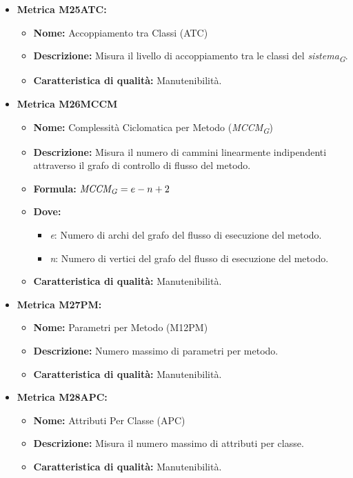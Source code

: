 \begin{itemize}
            \item \textbf{Metrica M25ATC:}
                  \begin{itemize}
                      \item \textbf{Nome:} Accoppiamento tra Classi (ATC)
                      \item \textbf{Descrizione:} Misura il livello di accoppiamento tra le classi del \textit{sistema}\textsubscript{\textit{G}}.
                      \item \textbf{Caratteristica di qualità:} Manutenibilità.
                  \end{itemize}

        \item \textbf{Metrica M26MCCM}
            \begin{itemize}
            \item \textbf{Nome:} Complessità Ciclomatica per Metodo (\textit{MCCM}\textsubscript{\textit{G}})
            \item \textbf{Descrizione:} Misura il numero di cammini linearmente indipendenti attraverso il grafo di controllo di flusso del metodo.
            \item \textbf{Formula:} $\textit{MCCM}\textsubscript{\textit{G}} = e - n + 2$
            \item \textbf{Dove:}
            \begin{itemize}
                        \item \textit{e}: Numero di archi del grafo del flusso di esecuzione del metodo.
                        \item \textit{n}: Numero di vertici del grafo del flusso di esecuzione del metodo.
            \end{itemize}
            \item \textbf{Caratteristica di qualità:} Manutenibilità.
        \end{itemize}

        \item \textbf{Metrica M27PM:}
        \begin{itemize}
            \item \textbf{Nome:} Parametri per Metodo (M12PM)
            \item \textbf{Descrizione:} Numero massimo di parametri per metodo.
            \item \textbf{Caratteristica di qualità:} Manutenibilità.
          \end{itemize}

        \item \textbf{Metrica M28APC:}
          \begin{itemize}
              \item \textbf{Nome:} Attributi Per Classe (APC)
              \item \textbf{Descrizione:} Misura il numero massimo di attributi per classe.
              \item \textbf{Caratteristica di qualità:} Manutenibilità.
          \end{itemize} 


\end{itemize}
